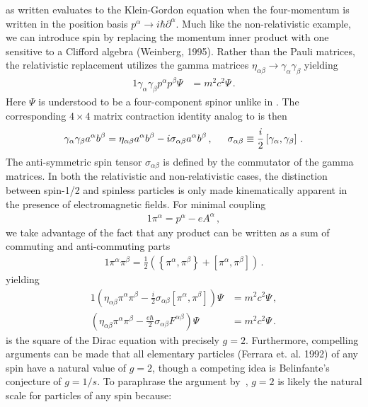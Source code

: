  as written evaluates to the Klein-Gordon equation when the four-momentum is written in the position basis $p^{\alpha}\rightarrow i\hbar\partial^{\alpha}$. Much like the non-relativistic example, we can introduce spin by replacing the momentum inner product with one sensitive to a Clifford algebra (Weinberg, 1995). Rather than the Pauli matrices, the relativistic replacement utilizes the gamma matrices $\eta_{\alpha\beta}\rightarrow\gamma_{\alpha}\gamma_{\beta}$ yielding
\begin{alignat}{1}
	\label{eq:spin:03} \gamma_{\alpha}\gamma_{\beta}p^{\alpha}p^{\beta}\Psi&=m^{2}c^{2}\Psi\,.
\end{alignat}
Here $\Psi$ is understood to be a four-component spinor unlike in . The corresponding $4\times4$ matrix contraction identity analog to  is then
\begin{alignat}{1}
	\label{eq:spin:04} \gamma_{\alpha}\gamma_{\beta}a^{\alpha}b^{\beta}=\eta_{\alpha\beta}a^{\alpha}b^{\beta}-i\sigma_{\alpha\beta}a^{\alpha}b^{\beta}\,,\indent \sigma_{\alpha\beta}\equiv\frac{i}{2}\left[\gamma_{\alpha},\gamma_{\beta}\right]\,.
\end{alignat}
The anti-symmetric spin tensor $\sigma_{\alpha\beta}$ is defined by the commutator of the gamma matrices. In both the relativistic and non-relativistic cases, the distinction between spin-1/2 and spinless particles is only made kinematically apparent in the presence of electromagnetic fields. For minimal coupling
\begin{alignat}{1}
  \label{eq:spin:05} \pi^{\alpha}=p^{\alpha}-eA^{\alpha}\,,
\end{alignat}
we take advantage of the fact that any product can be written as a sum of commuting and anti-commuting parts
\begin{alignat}{1}
	\label{eq:spin:06} \pi^{\alpha}\pi^{\beta}=\frac{1}{2}\left(\left\{\pi^{\alpha},\pi^{\beta}\right\}+\left[\pi^{\alpha},\pi^{\beta}\right]\right)\,.
\end{alignat}
yielding
\begin{alignat}{1}
	\label{eq:spin:07a} \left(\eta_{\alpha\beta}\pi^{\alpha}\pi^{\beta}-\frac{i}{2}\sigma_{\alpha\beta}\left[\pi^{\alpha},\pi^{\beta}\right]\right)\Psi&=m^{2}c^{2}\Psi\,,\\
	\label{eq:spin:07b} \left(\eta_{\alpha\beta}\pi^{\alpha}\pi^{\beta}-\frac{e\hbar}{2}\sigma_{\alpha\beta}F^{\alpha\beta}\right)\Psi&=m^{2}c^{2}\Psi\,.
\end{alignat}
 is the square of the Dirac equation with precisely $g=2$. Furthermore, compelling arguments can be made that all elementary particles (Ferrara et. al. 1992) of any spin have a natural value of $g=2$, though a competing idea is Belinfante's conjecture of $g=1/s$. To paraphrase the argument by~\citet*{Ferrara:1992yc}, $g=2$ is likely the natural scale for particles of any spin because:
